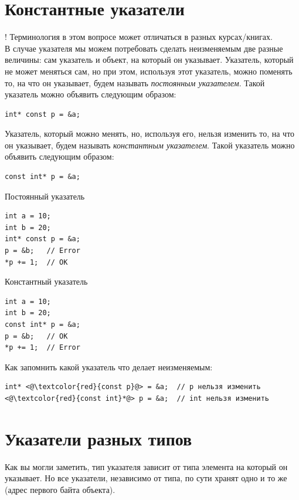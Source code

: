 \documentclass[10pt]{article}
\begin{document}
\newpage
\section*{Константные указатели}
! Терминология в этом вопросе может отличаться в разных курсах/книгах.\\

В случае указателя мы можем потребовать сделать неизменяемым две разные величины: сам указатель и объект, на который он указывает. 
Указатель, который не может меняться сам, но при этом, используя этот указатель, можно поменять то, на что он указывает, будем называть \textit{постоянным указателем}. Такой указатель можно объявить следующим образом:
\begin{lstlisting}
int* const p = &a;
\end{lstlisting}

Указатель, который можно менять, но, используя его, нельзя изменить то, на что он указывает, будем называть \textit{константным указателем}. Такой указатель можно объявить следующим образом:
\begin{lstlisting}
const int* p = &a;
\end{lstlisting}

\begin{multicols}{2}
Постоянный указатель
\begin{lstlisting}
int a = 10;
int b = 20;
int* const p = &a;
p = &b;   // Error
*p += 1;  // OK
\end{lstlisting}

Константный указатель
\begin{lstlisting}
int a = 10;
int b = 20;
const int* p = &a;
p = &b;   // OK
*p += 1;  // Error
\end{lstlisting}
\end{multicols}

Как запомнить какой указатель что делает неизменяемым:
\begin{lstlisting}
int* <@\textcolor{red}{const p}@> = &a;  // p нельзя изменить
<@\textcolor{red}{const int}*@> p = &a;  // int нельзя изменить
\end{lstlisting}


\section*{Указатели разных типов}
Как вы могли заметить, тип указателя зависит от типа элемента на который он указывает. Но все указатели, независимо от типа, по сути хранят одно и то же (адрес первого байта объекта). 
\end{document}
